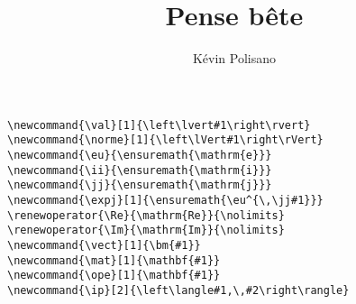 \documentclass[11pt]{amsart}
\title{Pense bête}
\author{Kévin Polisano}
\begin{document}
\maketitle

\begin{lstlisting}
\newcommand{\val}[1]{\left\lvert#1\right\rvert} 
\newcommand{\norme}[1]{\left\lVert#1\right\rVert}
\newcommand{\eu}{\ensuremath{\mathrm{e}}}
\newcommand{\ii}{\ensuremath{\mathrm{i}}}
\newcommand{\jj}{\ensuremath{\mathrm{j}}}
\newcommand{\expj}[1]{\ensuremath{\eu^{\,\jj#1}}}
\renewoperator{\Re}{\mathrm{Re}}{\nolimits}
\renewoperator{\Im}{\mathrm{Im}}{\nolimits}
\newcommand{\vect}[1]{\bm{#1}}
\newcommand{\mat}[1]{\mathbf{#1}}
\newcommand{\ope}[1]{\mathbf{#1}}
\newcommand{\ip}[2]{\left\langle#1,\,#2\right\rangle}
\end{lstlisting}
\end{document}
